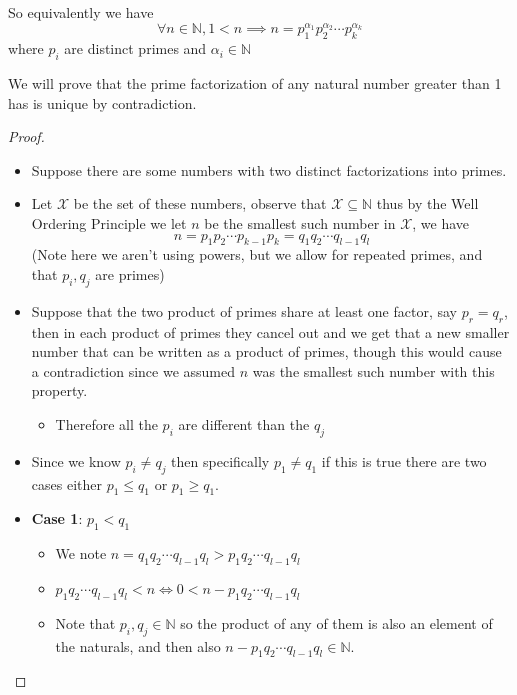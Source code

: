 \documentclass[11pt]{book}
\begin{document}
So equivalently we have 
\[
\forall n \in \mathbb{N} , 1 < n \implies n = p_{1} ^{\alpha _{1} } p_{2} ^{\alpha _{2} } \dotsm p_{k} ^{\alpha _{k} }  
\]
where $p_{i} $ are distinct primes and $\alpha _{i} \in \mathbb{N} $ 

We will prove that the prime factorization of any natural number greater than 1 has is unique by contradiction.

\newpage

\begin{proof}
$ $\newline
\begin{itemize}
    \item Suppose there are some numbers with two distinct factorizations into primes.
    \item Let $\mathcal{X} $ be the set of these numbers, observe that $\mathcal{X} \subseteq \mathbb{N} $ thus by the Well Ordering Principle we let $n$ be the smallest such number in $\mathcal{X} $, we have 
        \[
        n= p_1 p_2 \dotsb p_{k - 1} p_{k} = q_1 q_2 \dotsb q_{l - 1} q_{l}
        \]
        (Note here we aren't using powers, but we allow for repeated primes, and that $p_{i} ,q_{j} $ are primes)
    \item Suppose that the two product of primes share at least one factor, say $p_{r} = q_{r} $, then in each product of primes they cancel out and we get that a new smaller number that can be written as a product of primes, though this would cause a contradiction since we assumed $n$ was the smallest such number with this property. 
        \begin{itemize}
            \item Therefore all the $p_{i} $ are different than the $q_{j} $ 
        \end{itemize}
    \item Since we know $p_{i} \neq q_{j} $ then specifically $p_{1} \neq q_{1} $ if this is true there are two cases either $p_{1} \le q_{1} $ or $p_{1} \ge q_{1} $.
    \item \textbf{Case 1}: $p_{1} < q_{1} $ 
        \begin{itemize}
            \item We note $n = q_1 q_2 \dotsb q_{l - 1} q_{l} > p_1 q_2 \dotsb q_{l - 1} q_{l}$ 
            \item $p_1 q_2 \dotsb q_{l - 1} q_{l} < n \Leftrightarrow 0 < n - p_1 q_2 \dotsb q_{l - 1} q_{l}$ 
            \item Note that $p_{i} , q_{j} \in \mathbb{N} $ so the product of any of them is also an element of the naturals, and then also $n - p_1 q_2 \dotsb q_{l - 1} q_{l} \in \mathbb{N}$.   

\end{itemize}
\end{itemize}
\end{proof}
\end{document}

